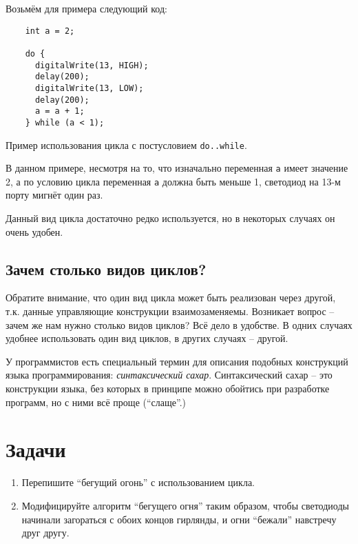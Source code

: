 \documentclass[../sparc.tex]{subfiles}
\begin{document}
Возьмём для примера следующий код:

\begin{listing}[ht]
  \begin{verbatim}
    int a = 2;

    do {
      digitalWrite(13, HIGH);
      delay(200);
      digitalWrite(13, LOW);
      delay(200);
      a = a + 1;
    } while (a < 1);
  \end{verbatim}
  \label{listing:dialogues-with-computer-do-while-example}
  \caption{Пример использования цикла с постусловием \texttt{do..while}.}
\end{listing}

В данном примере, несмотря на то, что изначально переменная \texttt{a} имеет
значение 2, а по условию цикла переменная \texttt{a} должна быть меньше 1,
светодиод на 13-м порту мигнёт один раз.

Данный вид цикла достаточно редко используется, но в некоторых случаях он очень
удобен.

\subsection{Зачем столько видов циклов?}

Обратите внимание, что один вид цикла может быть реализован через другой, т.к.
данные управляющие конструкции взаимозаменяемы. Возникает вопрос -- зачем же нам
нужно столько видов циклов? Всё дело в удобстве. В одних случаях удобнее
использовать один вид циклов, в других случаях -- другой.

У программистов есть специальный термин для описания подобных конструкций языка
программирования: \emph{синтаксический сахар}.  Синтаксический сахар -- это
конструкции языка, без которых в принципе можно обойтись при разработке
программ, но с ними всё проще (``слаще''.)

\section{Задачи}
\begin{enumerate}
\item Перепишите ``бегущий огонь'' с использованием цикла.
\item Модифицируйте алгоритм ``бегущего огня'' таким образом, чтобы светодиоды
  начинали загораться с обоих концов гирлянды, и огни ``бежали'' навстречу друг
  другу.
\end{enumerate}
\end{document}
